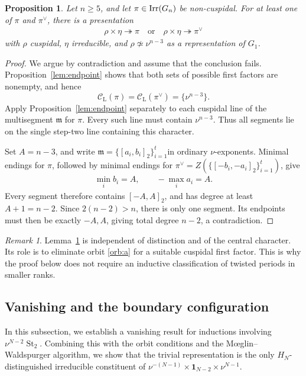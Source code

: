 \documentclass[11pt,leqno]{amsart}
\numberwithin{equation}{section}
\theoremstyle{plain}
\newtheorem{proposition}[theorem]{Proposition}
\theoremstyle{definition}
\theoremstyle{remark}
\newtheorem{remark}[theorem]{Remark}
\DeclareMathOperator{\St}{St}
\newcommand{\one}{\mathbf{1}}
\newcommand{\cl}{\mathcal{C}_{\mathrm{L}}}
\newcommand{\onto}{\twoheadrightarrow}
\newcommand{\seg}[2]{[#1,#2]_2}
\begin{document}
	
	\begin{proposition}\label{lem:choice}
		Let $n\ge5$, and let $\pi\in{\rm Irr}(G_n)$ be non-cuspidal.
		For at least one of $\pi$ and $\pi^\vee$, there is a presentation
		\begin{align*}
			\rho\times\eta\onto\pi
			\quad\text{or}\quad
			\rho\times\eta\onto\pi^\vee
		\end{align*}
		with $\rho$ cuspidal, $\eta$ irreducible, and
		$\rho\not\simeq\nu^{n-3}$ as a representation of $G_1$.
	\end{proposition}
	\begin{proof}
		We argue by contradiction and assume that the conclusion fails.
		Proposition~\ref{lem:endpoint} shows that
		both sets of possible first factors are nonempty, and hence
		\begin{equation}\label{eq:bad-only}
			\cl(\pi)=\cl(\pi^\vee)=\{\nu^{n-3}\}.
		\end{equation}
		Apply Proposition~\ref{lem:endpoint} separately to each cuspidal line of the
		multisegment $\mathfrak m$ for $\pi$.
		Every such line must contain $\nu^{n-3}$. 
		Thus all segments lie on the single step-two line containing this character.
		
		Set $A=n-3$, and write
		$\mathfrak m=\{\seg{a_i}{b_i}\}_{i=1}^t$in ordinary
		$\nu$-exponents. Minimal endings for $\pi$, followed by minimal
		endings for
		$\pi^\vee=Z(\{\seg{-b_i}{-a_i}\}_{i=1}^t)$, give
		\begin{align*}
			\min_i b_i=A,\qquad -\max_i a_i=A.
		\end{align*}
		Every segment therefore contains $\seg{-A}{A}$, and has degree
		at least $A+1=n-2$. Since $2(n-2)>n$, there is only one segment.
		Its endpoints must then be exactly $-A,A$, giving total degree
		$n-2$, a contradiction.
	\end{proof}
	
	\begin{remark}
		Lemma~\ref{lem:choice} is independent of distinction and of the central character. 
		Its role is to eliminate orbit \ref{orb:a} for a suitable
		cuspidal first factor. This is why the proof below does not require
		an inductive classification of twisted periods in smaller ranks.
	\end{remark}
	
	\subsection{Vanishing and the boundary configuration}
	In this subsection, we establish a vanishing result for
	inductions involving $\nu^{N-2}\St_2$. Combining this with
	the orbit conditions and the M\oe glin--Waldspurger algorithm,
	we show that the trivial representation is the only
	$H_N$-distinguished irreducible constituent of
	$\nu^{-(N-1)}\times\one_{N-2}\times\nu^{N-1}$.
	
\end{document}
